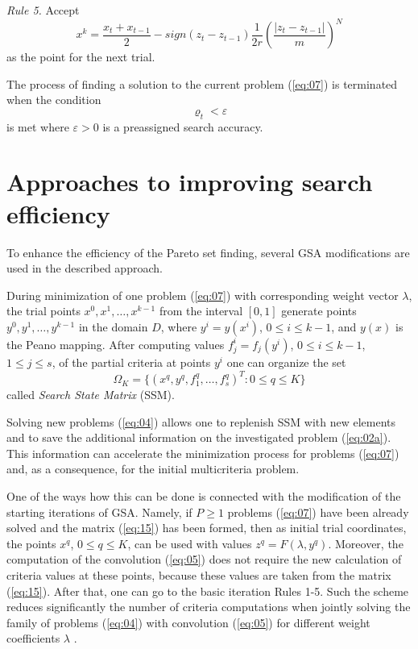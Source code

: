 \documentclass[runningheads]{llncs}
\begin{document}
\textit{Rule 5.} Accept
\begin{equation}
    \label{eq:13}
    x^{k} = \frac{x_t + x_{t-1}}{2} - sign(z_t - z_{t-1}) \frac{1}{2r} \left(\frac{|z_t - z_{t-1}|}{m} \right)^N
\end{equation}
as the point for the next trial.

The process of finding a solution to the current problem (\ref{eq:07}) is terminated when the condition
\begin{equation}
    \label{eq:14}
    \varrho_t < \varepsilon
\end{equation}
is met where $\varepsilon > 0$ is a preassigned search accuracy.



\section{Approaches to improving search efficiency}
\label{sec:4}

To enhance the efficiency of the Pareto set finding, several GSA modifications are used in the described approach.

During minimization of one problem (\ref{eq:07}) with corresponding weight vector $\lambda$, the trial points $x^0, x^1,\dots,x^{k-1}$ from the interval $[0,1]$ generate points $y^0, y^1,\dots,y^{k-1}$ in the domain $D$, where $y^i=y(x^i)$, $0 \leq i \leq k-1$, and $y(x)$ is the Peano mapping. After computing values $f^i_j=f_j(y^i)$, $0 \leq i \leq k-1$, $1 \leq j \leq s$, of the partial criteria at points $y^i$ one can organize the set 
\begin{equation}
    \label{eq:15}
    \Omega_K=\{(x^q,y^q,f^q_1,\dots,f^q_s)^T: 0 \leq q \leq K\}
\end{equation}
called \textit{Search State Matrix} (SSM).

Solving new problems (\ref{eq:04}) allows one to replenish SSM with new elements and to save the additional information on the investigated problem (\ref{eq:02a}). This information can accelerate the minimization process for problems (\ref{eq:07}) and, as a consequence, for the initial multicriteria problem. 

One of the ways how this can be done is connected with the modification of the starting iterations of GSA. Namely, if $P \geq 1$ problems (\ref{eq:07}) have been already solved and the matrix (\ref{eq:15}) has been formed, then as initial trial coordinates, the points $x^q$, $0 \leq q \leq K$, can be used with values $z^q = F(\lambda,y^q)$. Moreover, the computation of the convolution (\ref{eq:05}) does not require the new calculation of criteria values at these points, because these values are taken from the matrix (\ref{eq:15}). After that, one can go to the basic iteration Rules 1-5. Such the scheme reduces significantly the number of criteria computations when jointly solving the family of problems (\ref{eq:04}) with convolution (\ref{eq:05}) for different weight coefficients $\lambda$ \cite{ML_MCO_2023,Gergel2018,GergelKozinov2020}.
\end{document}

